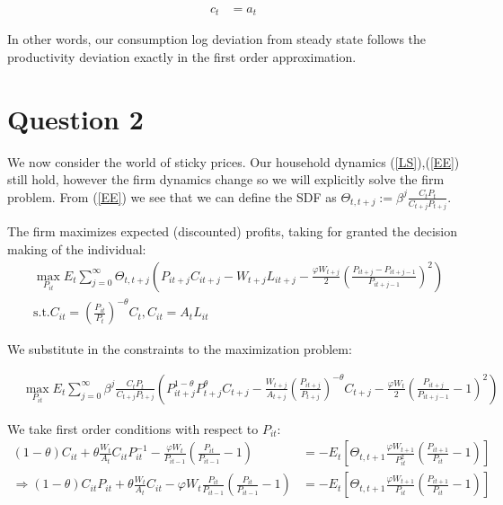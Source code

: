 \documentclass[11pt]{article} %
\begin{document}
\begin{align}
c_t &= a_t
\end{align}

In other words, our consumption log deviation from steady state follows the productivity deviation exactly in the first order approximation.

\section{Question 2}
We now consider the world of sticky prices. Our household dynamics (\ref{LS}),(\ref{EE}) still hold, however the firm dynamics change so we will explicitly solve the firm problem. From (\ref{EE}) we see that we can define the SDF as $\Theta_{t,t+j} := \beta^j \frac{C_tP_t}{C_{t+j}P_{t+j}}$.

The firm maximizes expected (discounted) profits, taking for granted the decision making of the individual:
\begin{align*}
&\max_{P_{it}} E_t\sum_{j=0}^{\infty} \Theta_{t,t+j}\left( P_{it+j} C_{it+j} - W_{t+j}L_{it+j} - \frac{\varphi W_{t+j}}{2} \left( \frac{P_{it+j} - P_{it+j-1}}{P_{it+j-1}} \right)^2 \right)\\
&\text{s.t.} C_{it} = \left( \frac{P_{it}}{P_t} \right)^{-\theta}C_t, C_{it} = A_tL_{it}
\end{align*}

We substitute in the constraints to the maximization problem:

\begin{align*}
&\max_{P_{it}} E_t\sum_{j=0}^{\infty}  \beta^j \frac{C_tP_t}{C_{t+j}P_{t+j}}\left( P_{it+j}^{1-\theta}  P_{t+j}^{\theta}C_{t+j} - \frac{W_{t+j}}{A_{t+j}} \left( \frac{P_{it+j}}{P_{t+j}} \right)^{-\theta}C_{t+j} - \frac{\varphi W_t}{2} \left( \frac{P_{it+j}}{P_{it+j-1}} - 1 \right)^2 \right)
\end{align*}


We take first order conditions with respect to $P_{it}$:
\begin{align*}
(1-\theta)C_{it} + \theta\frac{W_t}{A_t}C_{it}P_{it}^{-1} - \frac{\varphi W_t}{P_{it-1}}\left(\frac{P_{it}}{P_{it-1}} - 1 \right) &=-E_t\left[\Theta_{t,t+1}\frac{\varphi W_{t+1}}{P_{it}^2}\left( \frac{P_{it+1}}{P_{it}} - 1 \right) \right]\\
\Rightarrow  (1-\theta)C_{it}P_{it} + \theta\frac{W_t}{A_t}C_{it} - \varphi W_t \frac{P_{it}}{P_{it-1}}\left(\frac{P_{it}}{P_{it-1}} - 1 \right) &=-E_t\left[\Theta_{t,t+1}\frac{\varphi W_{t+1}}{P_{it}}\left( \frac{P_{it+1}}{P_{it}} - 1 \right) \right]
\end{align*}
\end{document}

